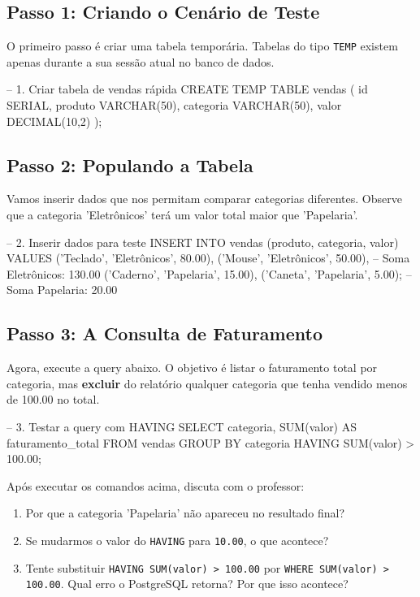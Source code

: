 \documentclass[12pt,a4paper,openright]{book}
\begin{document}
\subsection{Passo 1: Criando o Cenário de Teste}

O primeiro passo é criar uma tabela temporária. Tabelas do tipo \texttt{TEMP} existem apenas durante a sua sessão atual no banco de dados.

\begin{sqlcode}
-- 1. Criar tabela de vendas rápida
CREATE TEMP TABLE vendas (
    id SERIAL,
    produto VARCHAR(50),
    categoria VARCHAR(50),
    valor DECIMAL(10,2)
);
\end{sqlcode}

\subsection{Passo 2: Populando a Tabela}

Vamos inserir dados que nos permitam comparar categorias diferentes. Observe que a categoria 'Eletrônicos' terá um valor total maior que 'Papelaria'.

\begin{sqlcode}
-- 2. Inserir dados para teste
INSERT INTO vendas (produto, categoria, valor) VALUES
('Teclado', 'Eletrônicos', 80.00),
('Mouse',   'Eletrônicos', 50.00),  -- Soma Eletrônicos: 130.00
('Caderno', 'Papelaria',   15.00),
('Caneta',  'Papelaria',    5.00);  -- Soma Papelaria: 20.00
\end{sqlcode}

\subsection{Passo 3: A Consulta de Faturamento}



Agora, execute a query abaixo. O objetivo é listar o faturamento total por categoria, mas \textbf{excluir} do relatório qualquer categoria que tenha vendido menos de 100.00 no total.

\begin{sqlcode}
-- 3. Testar a query com HAVING
SELECT categoria, SUM(valor) AS faturamento_total
FROM vendas
GROUP BY categoria
HAVING SUM(valor) > 100.00;
\end{sqlcode}

\begin{tcolorbox}[colback=orange!5,colframe=orange!75!black,title=Questionário de Reflexão]
Após executar os comandos acima, discuta com o professor:
\begin{enumerate}
    \item Por que a categoria 'Papelaria' não apareceu no resultado final?
    \item Se mudarmos o valor do \texttt{HAVING} para \texttt{10.00}, o que acontece?
    \item Tente substituir \texttt{HAVING SUM(valor) > 100.00} por \texttt{WHERE SUM(valor) > 100.00}. Qual erro o PostgreSQL retorna? Por que isso acontece?
\end{enumerate}
\end{tcolorbox}
\end{document}
